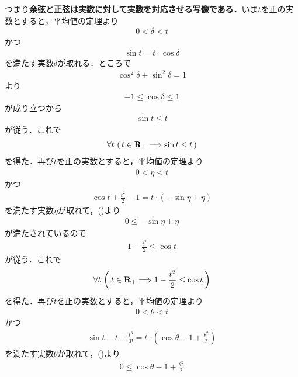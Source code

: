 	
	つまり{\bf 余弦と正弦は実数に対して実数を対応させる写像である．}いま$t$を正の実数とすると，平均値の定理より
	\begin{align}
		0 < \delta < t
	\end{align}
	かつ
	\begin{align}
		\sin{t} = t \cdot \cos{\delta}
	\end{align}
	を満たす実数$\delta$が取れる．ところで
	\begin{align}
		\cos^2{\delta} + \sin^2{\delta} = 1
	\end{align}
	より
	\begin{align}
		-1 \leq \cos{\delta} \leq 1
	\end{align}
	が成り立つから
	\begin{align}
		\sin{t} \leq t
	\end{align}
	が従う．これで
	\begin{align}
		\forall t\, \left(\, t \in \mathbf{R}_{+} \Longrightarrow \sin{t} \leq t\, \right)
		\label{fom:existence_of_pi_1}
	\end{align}
	を得た．再び$t$を正の実数とすると，平均値の定理より
	\begin{align}
		0 < \eta < t
	\end{align}
	かつ
	\begin{align}
		\cos{t} + \frac{t^2}{2} - 1 = t \cdot (-\sin{\eta} + \eta)
	\end{align}
	を満たす実数$\eta$が取れて，()より
	\begin{align}
		0 \leq -\sin{\eta} + \eta
	\end{align}
	が満たされているので
	\begin{align}
		1 - \frac{t^2}{2} \leq \cos{t}
	\end{align}
	が従う．これで
	\begin{align}
		\forall t\, \left(\, t \in \mathbf{R}_{+} 
		\Longrightarrow 1 - \frac{t^2}{2} \leq \cos{t}\, \right)
		\label{fom:existence_of_pi_2}
	\end{align}
	を得た．再び$t$を正の実数とすると，平均値の定理より
	\begin{align}
		0 < \theta < t
	\end{align}
	かつ
	\begin{align}
		\sin{t} - t + \frac{t^3}{3!} = t \cdot \left(\cos{\theta} - 1 + \frac{\theta^2}{2}\right)
	\end{align}
	を満たす実数$\theta$が取れて，()より
	\begin{align}
		0 \leq \cos{\theta} - 1 + \frac{\theta^2}{2}
	\end{align}
